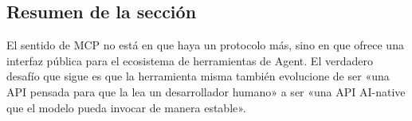 \subsection{Resumen de la sección}
El sentido de MCP no está en que haya un protocolo más, sino en que ofrece una interfaz pública para el ecosistema de herramientas de Agent. El verdadero desafío que sigue es que la herramienta misma también evolucione de ser «una API pensada para que la lea un desarrollador humano» a ser «una API AI-native que el modelo pueda invocar de manera estable».
